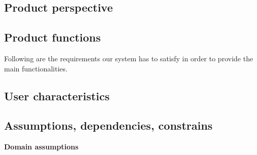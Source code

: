 \documentclass[../main.tex]{subfiles}
\begin{document}
\subsection{Product perspective}
\subsection{Product functions}

Following are the requirements our system has to satisfy in order to provide the main functionalities.

\begin{description}
	\item 
\end{description}

\subsection{User characteristics}
\subsection{Assumptions, dependencies, constrains}
{\bf Domain assumptions}
\end{document}
